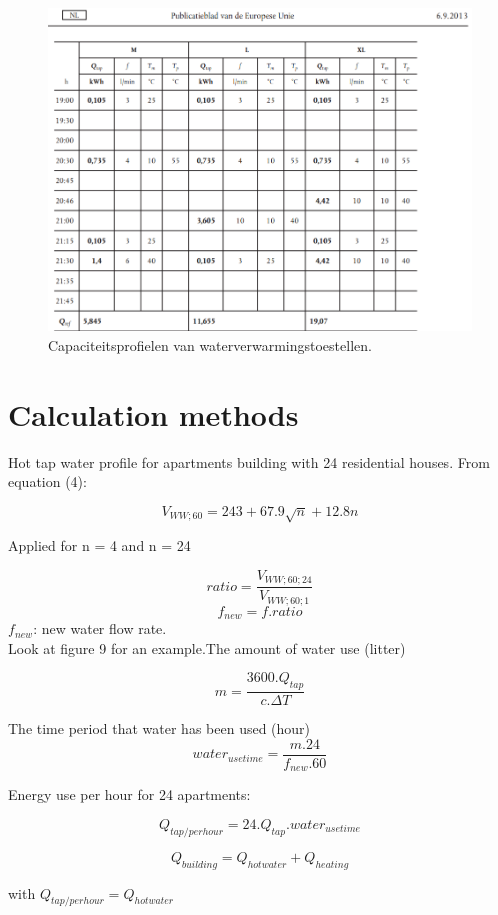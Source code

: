 \documentclass[a4paper,10pt]{article}
\begin{document}
\begin{appendices}
\begin{figure}[H]
\centering
\includegraphics[width=1\columnwidth]{pictures/Profile_M3.png}
\caption[Short title]{Capaciteitsprofielen van waterverwarmingstoestellen.}
\label{fig:ff17}\end{figure}


\section{Calculation methods}

Hot tap water profile for apartments building with 24 residential houses.
From equation (4):

\[V_{WW;60} = 243 + 67.9\sqrt{n} + 12.8n\]

Applied for n = 4 and n = 24

\[ratio =\frac{V_{WW;60;24}}{V_{WW;60;1}}\]
\[f_{new} =f.ratio\]
$f_{new}$: new water flow rate.\\
Look at figure 9 for an example.The amount of water use (litter)

\[m = \frac{3600.Q_{tap}}{c.\Delta T}\]

The time period that water has been used (hour)
\[water_{usetime} = \frac{m.24}{f_{new}.60}\]

Energy use per hour for 24 apartments:

\[Q_{tap/perhour} = 24.Q_{tap}.water_{usetime}\]

\[Q_{building} = Q_{hotwater} + Q_{heating}\]

with $Q_{tap/perhour} = Q_{hotwater}$



\end{appendices}
\end{document}
